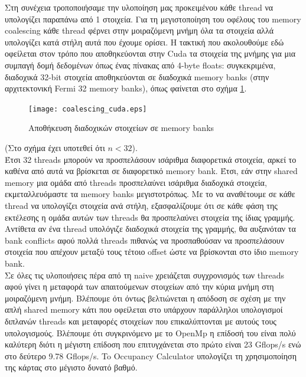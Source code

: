 \documentclass[11pt,a4paper]{article}
\begin{document}
Στη συνέχεια τροποποιήσαμε την υλοποίηση μας προκειμένου κάθε thread να υπολογίζει παραπάνω από 1 στοιχεία. Για τη μεγιστοποίηση 
του οφέλους του memory coalescing κάθε thread φέρνει στην μοιραζόμενη μνήμη όλα τα στοιχεία αλλά υπολογίζει κατά στήλη αυτά που 
έχουμε ορίσει. Η τακτική που ακολουθούμε εδώ οφείλεται στον τρόπο που αποθηκεύονται στην Cuda τα στοιχεία της μνήμης για μια συμπαγή δομή δεδομένων όπως ένας πίνακας από 4-byte floats: συγκεκριμένα, διαδοχικά 32-bit στοιχεία αποθηκεύονται σε διαδοχικά memory banks (στην αρχιτεκτονική Fermi 32 memory banks), όπως φαίνεται στο σχήμα \ref{figure:coalescing}.
\begin{figure}[h]
	\centering
	\texttt{[image: coalescing\_cuda.eps]} 
	\caption{Αποθήκευση διαδοχικών στοιχείων σε memory banks}	
	\label{figure:coalescing}
\end{figure} 
(Στο σχήμα έχει υποτεθεί ότι $n < 32$). \\
Έτσι 32 threads μπορούν να προσπελάσουν ισάριθμα διαφορετικά στοιχεία, αρκεί το καθένα από αυτά να βρίσκεται σε διαφορετικό memory bank. Έτσι, εάν στην shared memory μια ομάδα από threads προσπελαύνει ισάριθμα διαδοχικά στοιχεία, εκμεταλλευόμαστε τα memory banks μεγιστοτρόπως. Με το να αναθέτουμε σε κάθε thread να υπολογίζει στοιχεία ανά στήλη, εξασφαλίζουμε ότι σε κάθε φάση της εκτέλεσης η ομάδα αυτών των threads θα προσπελαύνει στοιχεία της ίδιας γραμμής. Αντίθετα αν ένα thread υπολόγιζε διαδοχικά στοιχεία της γραμμής, θα αυξανόταν τα bank conflicts αφού πολλά threads πιθανώς να προσπαθούσαν να προσπελάσουν στοιχεία που απέχουν μεταξύ τους τέτοιο offset ώστε να βρίσκονται στο ίδιο memory bank. \\
Σε όλες τις υλοποιήσεις πέρα από τη naive χρειάζεται συγχρονισμός των 
threads αφού γίνει η μεταφορά των απαιτούμενων στοιχείων από την κύρια μνήμη στη μοιραζόμενη μνήμη. Βλέπουμε ότι όντως βελτιώνεται
η απόδοση σε σχέση με την απλή shared memory κάτι που οφείλεται στο υπάρχουν παράλληλοι υπολογισμοί διπλανών threads και μεταφορές 
στοιχείων που επικαλύπτονται με αυτούς τους υπολογισμούς. Βλέπουμε ότι συγκρινόμενο με το OpenMp η επίδοσή του είναι πολύ καλύτερη διότι
η μέγιστη επίδοση που επιτυγχάνεται στο πρώτο είναι 23 Gflops/s ενώ στο δεύτερο 9.78 Gflops/s. To Occupancy Calculator υπολογίζει τη
χρησιμοποίηση της κάρτας στο μέγιστο δυνατό βαθμό.
\end{document}
